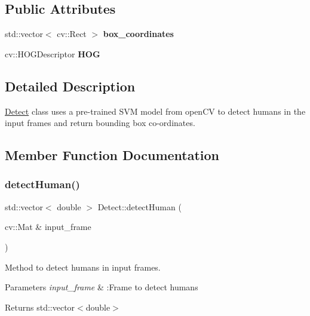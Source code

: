 \subsection*{Public Attributes}
\begin{DoxyCompactItemize}
\item 
\mbox{\label{classDetect_a26e995ab3b691ebf5f2ba2040aede421}} 
std\+::vector$<$ cv\+::\+Rect $>$ {\bfseries box\+\_\+coordinates}
\item 
\mbox{\label{classDetect_a7b4db15c556678a0f8e7ec1f925bd79d}} 
cv\+::\+H\+O\+G\+Descriptor {\bfseries H\+OG}
\end{DoxyCompactItemize}


\subsection{Detailed Description}
\hyperlink{classDetect}{Detect} class uses a pre-\/trained S\+VM model from open\+CV to detect humans in the input frames and return bounding box co-\/ordinates. 

\subsection{Member Function Documentation}
\mbox{\label{classDetect_a7a27975d3aeb0ef43042106554fccb07}} 
\subsubsection{\texorpdfstring{detect\+Human()}{detectHuman()}}
{\footnotesize\ttfamily std\+::vector$<$ double $>$ Detect\+::detect\+Human (\begin{DoxyParamCaption}\item[{cv\+::\+Mat \&}]{input\+\_\+frame }\end{DoxyParamCaption})}



Method to detect humans in input frames. 


\begin{DoxyParams}{Parameters}
{\em input\+\_\+frame} & \+:Frame to detect humans \\
\hline
\end{DoxyParams}
\begin{DoxyReturn}{Returns}
std\+::vector$<$double$>$ 
\end{DoxyReturn}
\mbox{\label{classDetect_a67c037bd61725af5ec53beadcb4f58d0}} 
